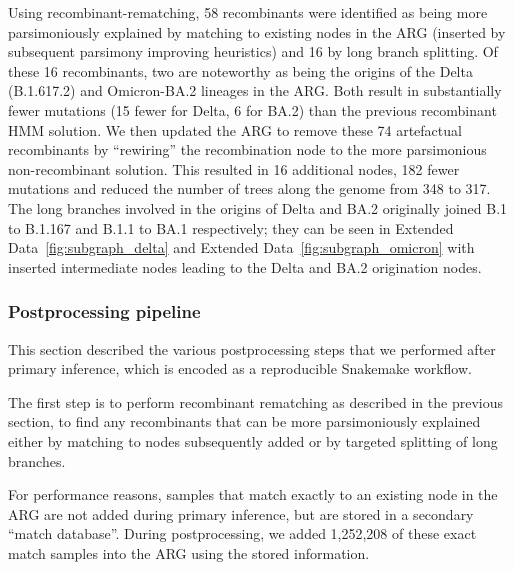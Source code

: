 \documentclass[12pt]{article}
\newcommand{\edref}[1]{Extended Data~\ref{#1}}
\begin{document}
Using recombinant-rematching,
58 recombinants were identified as being more parsimoniously
explained by matching to existing nodes in the ARG (inserted by
subsequent parsimony improving heuristics) and 16 by long branch
splitting. Of these 16 recombinants, two are noteworthy as
being the origins of the Delta (B.1.617.2) and Omicron-BA.2 lineages in the ARG.
Both result in substantially fewer mutations (15 fewer for
Delta, 6 for BA.2) than the previous recombinant HMM solution.
We then updated the ARG to remove these 74 artefactual
recombinants by ``rewiring'' the recombination node to the
more parsimonious non-recombinant solution. This
resulted in 16 additional nodes, 182 fewer mutations and reduced
the number of trees along the genome from 348 to 317. The long branches
involved in the origins of Delta and BA.2 originally joined
B.1 to B.1.167 and B.1.1 to BA.1 respectively; they can be seen
in \edref{fig:subgraph_delta} and \edref{fig:subgraph_omicron}
with inserted intermediate nodes leading to the Delta and BA.2
origination nodes.


\subsubsection*{Postprocessing pipeline}
\label{sec:arg_postprocessing}
This section described the various postprocessing steps that
we performed after primary inference,
which is encoded as a reproducible Snakemake
workflow. %

The first step is to perform recombinant rematching as described in the previous
section, to find any recombinants that can be more parsimoniously explained
either by matching to nodes subsequently added or by targeted
splitting of long branches.

For performance reasons, samples that match exactly to an existing
node in the ARG are not added during primary inference, but are
stored in a secondary ``match database''.
During postprocessing, we added 1,252,208 of these exact match samples
into the ARG using the stored information.
\end{document}
